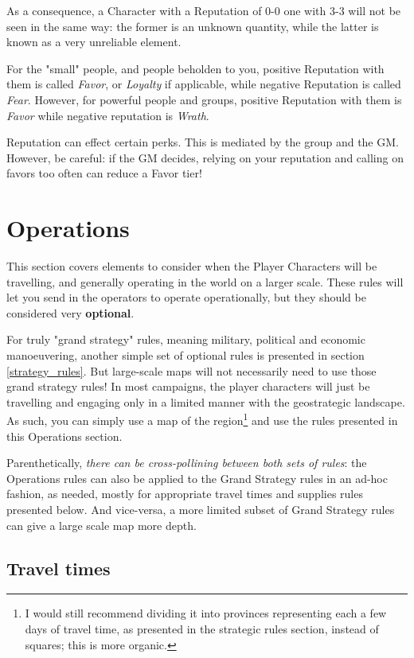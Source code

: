 As a consequence, a Character with a Reputation of 0-0 one with 3-3 will not be seen in the same way: the former is an unknown quantity, while the latter is known as a very unreliable element.

For the "small" people, and people beholden to you, positive Reputation with them is called \textit{Favor}, or \textit{Loyalty} if applicable, while negative Reputation is called \textit{Fear}. However, for powerful people and groups, positive Reputation with them is \textit{Favor} while negative reputation is \textit{Wrath}.

Reputation can effect certain perks. This is mediated by the group and the GM. However, be careful: if the GM decides, relying on your reputation and calling on favors too often can reduce a Favor tier!



\section{Operations}
\label{operations}

This section covers elements to consider when the Player Characters will be travelling, and generally operating in the world on a larger scale. These rules will let you send in the operators to operate operationally, but they should be considered very \textbf{optional}.

For truly "grand strategy" rules, meaning military, political and economic manoeuvering, another simple set of optional rules is presented in section \ref{strategy_rules}. But large-scale maps will not necessarily need to use those grand strategy rules! In most campaigns, the player characters will just be travelling and engaging only in a limited manner with the geostrategic landscape. As such, you can simply use a map of the region\footnote{I would still recommend dividing it into provinces representing each a few days of travel time, as presented in the strategic rules section, instead of squares; this is more organic.} and use the rules presented in this Operations section.

Parenthetically, \textit{there can be cross-pollining between both sets of rules}: the Operations rules can also be applied to the Grand Strategy rules in an ad-hoc fashion, as needed, mostly for appropriate travel times and supplies rules presented below. And vice-versa, a more limited subset of Grand Strategy rules can give a large scale map more depth.


\subsection{Travel times}

